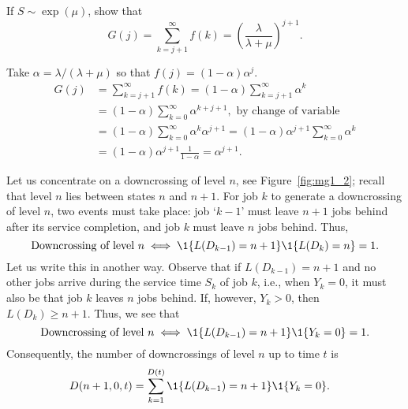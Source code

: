 \begin{exercise}
 If $S\sim \exp(\mu)$, show that 
  \begin{equation}
G(j) = \sum_{k=j+1}^\infty f(k) =  \left(\frac{\lambda}{\lambda+\mu}\right)^{j+1}.
  \end{equation}
\begin{solution}
  Take $\alpha = \lambda/(\lambda+\mu)$ so that
  $f(j) = (1-\alpha) \alpha^j$.
\begin{equation*}
  \begin{split}
  G(j) 
&= \sum_{k=j+1}^\infty f(k)  = (1-\alpha) \sum_{k=j+1}^\infty \alpha^k \\
& = (1-\alpha) \sum_{k=0}^\infty \alpha^{k+j+1}, \text{ by change of variable}\\
& = (1-\alpha) \sum_{k=0}^\infty \alpha^{k}\alpha^{j+1}= (1-\alpha)\alpha^{j+1} \sum_{k=0}^\infty \alpha^k \\
&= (1-\alpha)\alpha^{j+1} \frac{1}{1-\alpha} = \alpha^{j+1}.
  \end{split}
\end{equation*}
    \end{solution}
\end{exercise}

Let us concentrate on a downcrossing of level $n$, see
Figure~\ref{fig:mg1_2}; recall that level $n$ lies between states $n$
and $n+1$. For job $k$ to generate a downcrossing of level $n$, two events must take place: 
 job `$k-1$' must leave $n+1$ jobs behind after its service completion, and  job $k$ must leave $n$ jobs behind. Thus, 
 \begin{equation*}
   \text{Downcrossing of level $n$} \iff \1{L(D_{k-1}) = n+1}\1{L(D_k)=n} = 1.
 \end{equation*}
Let us write this in another
way. Observe that if $L(D_{k-1})=n+1$ and no other jobs arrive during
the service time $S_k$ of job $k$, i.e., when $Y_k=0$, it must also be
that job $k$ leaves $n$ jobs behind. If, however, $Y_k>0$, then
$L(D_k)\geq n+1$.  Thus, we see that
 \begin{equation*}
   \text{Downcrossing of level $n$} \iff \1{L(D_{k-1}) = n+1}\1{Y_k=0} = 1.
 \end{equation*}
Consequently, the number of downcrossings of level $n$ up to time $t$ is
\begin{equation*}
  \begin{split}
  D(n+1, 0, t) 
&= \sum_{k=1}^{D(t)}\1{L(D_{k-1})=n+1}\1{Y_k=0}.
  \end{split}
\end{equation*}

